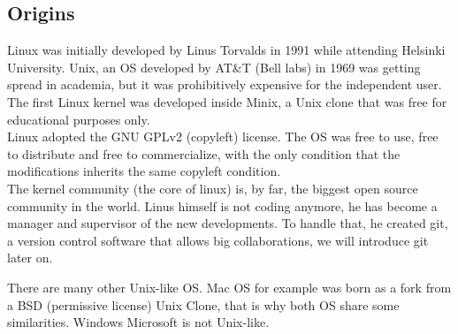 \documentclass[a4paper]{article}
\begin{document}
\subsection{Origins}
Linux was initially developed by Linus Torvalds in 1991 while attending Helsinki University. Unix, an OS developed by AT\&T (Bell labs) in 1969 was getting spread in academia, but it was prohibitively expensive for the independent user. The first Linux kernel was developed inside Minix, a Unix clone that was free for educational purposes only.\\
Linux adopted the GNU GPLv2 (copyleft) license. The OS was free to use, free to distribute and free to commercialize, with the only condition that the modifications inherits the same copyleft condition.\\
The kernel community (the core of linux) is, by far, the biggest open source community in the world. Linus himself is not coding anymore, he has become a manager and supervisor of the new developments. To handle that, he created git, a version control software that allows big collaborations, we will introduce git later on.

There are many other Unix-like OS. Mac OS for example was born as a fork from a BSD (permissive license) Unix Clone, that is why both OS share some similarities. Windows Microsoft is not Unix-like.
\end{document}
